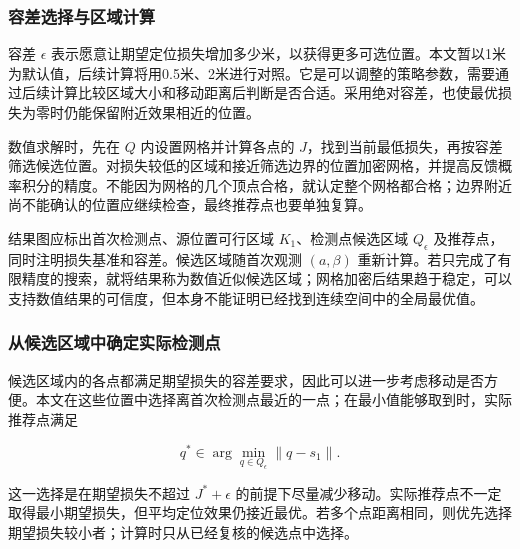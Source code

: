 \subsubsection{容差选择与区域计算}

容差 \(\epsilon\) 表示愿意让期望定位损失增加多少米，以获得更多可选位置。本文暂以1米为默认值，后续计算将用0.5米、2米进行对照。它是可以调整的策略参数，需要通过后续计算比较区域大小和移动距离后判断是否合适。采用绝对容差，也使最优损失为零时仍能保留附近效果相近的位置。

数值求解时，先在 \(Q\) 内设置网格并计算各点的 \(J\)，找到当前最低损失，再按容差筛选候选位置。对损失较低的区域和接近筛选边界的位置加密网格，并提高反馈概率积分的精度。不能因为网格的几个顶点合格，就认定整个网格都合格；边界附近尚不能确认的位置应继续检查，最终推荐点也要单独复算。

结果图应标出首次检测点、源位置可行区域 \(K_1\)、检测点候选区域 \(Q_\epsilon\) 及推荐点，同时注明损失基准和容差。候选区域随首次观测 \((a,\beta)\) 重新计算。若只完成了有限精度的搜索，就将结果称为数值近似候选区域；网格加密后结果趋于稳定，可以支持数值结果的可信度，但本身不能证明已经找到连续空间中的全局最优值。

\subsubsection{从候选区域中确定实际检测点}

候选区域内的各点都满足期望损失的容差要求，因此可以进一步考虑移动是否方便。本文在这些位置中选择离首次检测点最近的一点；在最小值能够取到时，实际推荐点满足

\begin{equation}
 q^*\in\arg\min_{q\in Q_\epsilon}\|q-s_1\|.
 \label{eq:q2-candidate-selection}
\end{equation}

这一选择是在期望损失不超过 \(J^*+\epsilon\) 的前提下尽量减少移动。实际推荐点不一定取得最小期望损失，但平均定位效果仍接近最优。若多个点距离相同，则优先选择期望损失较小者；计算时只从已经复核的候选点中选择。

